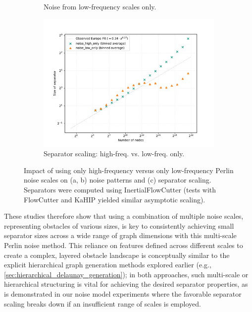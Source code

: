 \begin{figure}[tbhp]
\begin{subfigure}{0.25\linewidth}
		\caption{Noise from low-frequency scales only.}
		\label{fig:noise_low_freq_viz}
	\end{subfigure}
	\hfill
	\begin{subfigure}{0.45\linewidth}
		\centering
		\includegraphics[width=\linewidth]{graphics/noise_high_vs_low_only.pdf}
		\caption{Separator scaling: high-freq. vs. low-freq. only.}
		\label{fig:noise_ablation_sep_plot}
	\end{subfigure}
	\caption{Impact of using only high-frequency versus only low-frequency Perlin noise scales on (a, b) noise patterns and (c) separator scaling. Separators were computed using InertialFlowCutter (tests with FlowCutter and KaHIP yielded similar asymptotic scaling).}
	\label{fig:noise_layer_ablation}
\end{figure}

These studies therefore show that using a combination of multiple noise scales, representing obstacles of various sizes, is key to consistently achieving small separator sizes across a wide range of graph dimensions with this multi-scale Perlin noise method.
This reliance on features defined across different scales to create a complex, layered obstacle landscape is conceptually similar to the explicit hierarchical graph generation methods explored earlier (e.g., \cref{sec:hierarchical_delaunay_generation}); in both approaches, such multi-scale or hierarchical structuring is vital for achieving the desired separator properties, as is demonstrated in our noise model experiments where the favorable separator scaling breaks down if an insufficient range of scales is employed.



